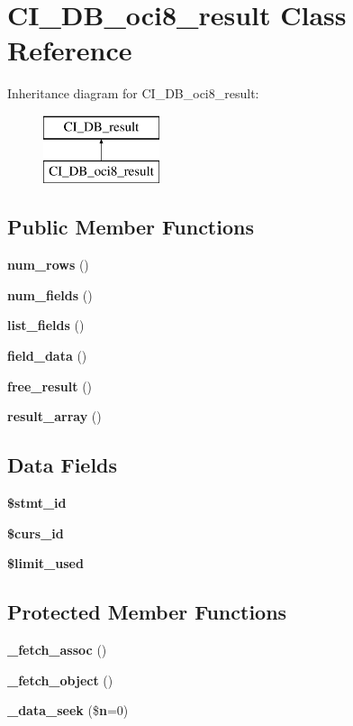 \section{C\-I\-\_\-\-D\-B\-\_\-oci8\-\_\-result Class Reference}
\label{class_c_i___d_b__oci8__result}
Inheritance diagram for C\-I\-\_\-\-D\-B\-\_\-oci8\-\_\-result\-:\begin{figure}[H]
\begin{center}
\leavevmode
\includegraphics[height=2.000000cm]{class_c_i___d_b__oci8__result}
\end{center}
\end{figure}
\subsection*{Public Member Functions}
\begin{DoxyCompactItemize}
\item 
{\bf num\-\_\-rows} ()
\item 
{\bf num\-\_\-fields} ()
\item 
{\bf list\-\_\-fields} ()
\item 
{\bf field\-\_\-data} ()
\item 
{\bf free\-\_\-result} ()
\item 
{\bf result\-\_\-array} ()
\end{DoxyCompactItemize}
\subsection*{Data Fields}
\begin{DoxyCompactItemize}
\item 
{\bf \$stmt\-\_\-id}
\item 
{\bf \$curs\-\_\-id}
\item 
{\bf \$limit\-\_\-used}
\end{DoxyCompactItemize}
\subsection*{Protected Member Functions}
\begin{DoxyCompactItemize}
\item 
{\bf \-\_\-fetch\-\_\-assoc} ()
\item 
{\bf \-\_\-fetch\-\_\-object} ()
\item 
{\bf \-\_\-data\-\_\-seek} (\${\bf n}=0)
\end{DoxyCompactItemize}


